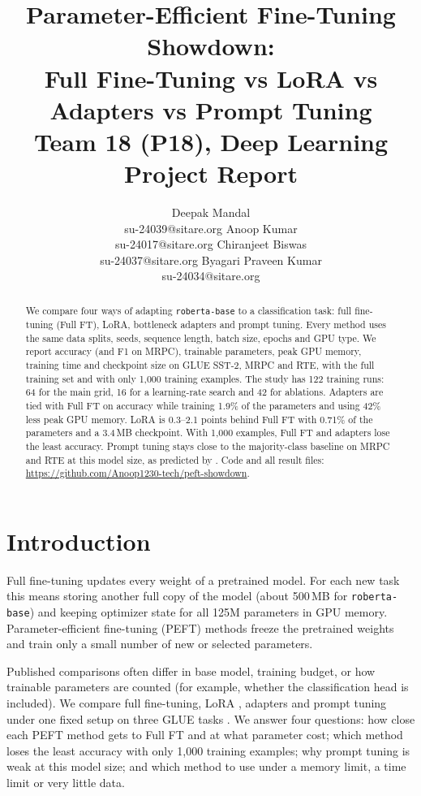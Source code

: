 \documentclass[11pt]{article}
\title{Parameter-Efficient Fine-Tuning Showdown:\\Full Fine-Tuning vs LoRA vs Adapters vs Prompt Tuning\\[4pt]\large Team 18 (P18), Deep Learning Project Report}
\author{Deepak Mandal \\ su-24039@sitare.org \And
  Anoop Kumar \\ su-24017@sitare.org \AND
  Chiranjeet Biswas \\ su-24037@sitare.org \And
  Byagari Praveen Kumar \\ su-24034@sitare.org}
\begin{document}
\maketitle

\begin{abstract}
We compare four ways of adapting \texttt{roberta-base} to a classification task: full fine-tuning (Full FT), LoRA, bottleneck adapters and prompt tuning. Every method uses the same data splits, seeds, sequence length, batch size, epochs and GPU type. We report accuracy (and F1 on MRPC), trainable parameters, peak GPU memory, training time and checkpoint size on GLUE SST-2, MRPC and RTE, with the full training set and with only 1,000 training examples. The study has 122 training runs: 64 for the main grid, 16 for a learning-rate search and 42 for ablations. Adapters are tied with Full FT on accuracy while training 1.9\% of the parameters and using 42\% less peak GPU memory. LoRA is 0.3--2.1 points behind Full FT with 0.71\% of the parameters and a 3.4\,MB checkpoint. With 1,000 examples, Full FT and adapters lose the least accuracy. Prompt tuning stays close to the majority-class baseline on MRPC and RTE at this model size, as predicted by \citet{lester2021}. Code and all result files: \url{https://github.com/Anoop1230-tech/peft-showdown}.
\end{abstract}

\section{Introduction}

Full fine-tuning updates every weight of a pretrained model. For each new task this means storing another full copy of the model (about 500\,MB for \texttt{roberta-base}) and keeping optimizer state for all 125M parameters in GPU memory. Parameter-efficient fine-tuning (PEFT) methods freeze the pretrained weights and train only a small number of new or selected parameters.

Published comparisons often differ in base model, training budget, or how trainable parameters are counted (for example, whether the classification head is included). We compare full fine-tuning, LoRA \citep{hu2022}, adapters \citep{houlsby2019} and prompt tuning \citep{lester2021} under one fixed setup on three GLUE tasks \citep{wang2019}. We answer four questions: how close each PEFT method gets to Full FT and at what parameter cost; which method loses the least accuracy with only 1,000 training examples; why prompt tuning is weak at this model size; and which method to use under a memory limit, a time limit or very little data.
\end{document}
